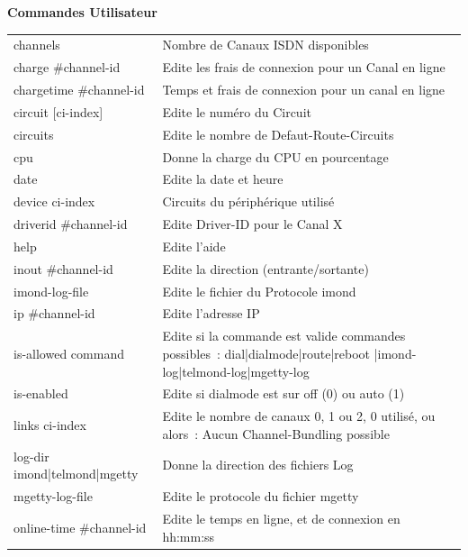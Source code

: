  \begin{table}
    \textbf{Commandes Utilisateur}

    \vspace{1ex}
    \begin{tabular}{lp{9cm}}
      channels                  & Nombre de Canaux ISDN disponibles \\
      charge \#channel-id       & Edite les frais de connexion pour un Canal en ligne \\
      chargetime \#channel-id   & Temps et frais de connexion pour un canal en ligne \\
      circuit [ci-index]        & Edite le numéro du Circuit \\
      circuits                  & Edite le nombre de Defaut-Route-Circuits \\
      cpu                       & Donne la charge du CPU en pourcentage \\
      date                      & Edite la date et heure \\
      device ci-index           & Circuits du périphérique utilisé \\
      driverid \#channel-id     & Edite Driver-ID pour le Canal X \\
      help                      & Edite l'aide \\
      inout \#channel-id        & Edite la direction (entrante/sortante) \\
      imond-log-file            & Edite le fichier du Protocole imond \\
      ip \#channel-id           & Edite l'adresse IP \\
      is-allowed command        & Edite si la commande est valide\newline
                                  commandes possibles~:
                                  dial|dialmode|route|reboot
                                  |imond-log|telmond-log|mgetty-log \\
      is-enabled                & Edite si dialmode est sur off (0) ou auto (1) \\
      links ci-index            & Edite le nombre de canaux 0, 1 ou 2, 0 utilisé,
                                  ou alors~: Aucun Channel-Bundling possible \\
      log-dir imond|telmond|mgetty& Donne la direction des fichiers Log \\
      mgetty-log-file           & Edite le protocole du fichier mgetty \\
      online-time \#channel-id  & Edite le temps en ligne, et de connexion en hh:mm:ss \\

\end{tabular}
\end{table}
